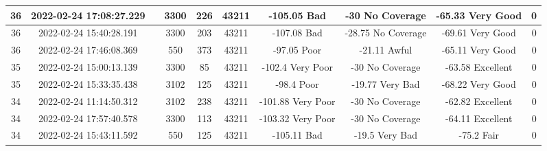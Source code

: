 \begin{longtable*}{|c|c|c|c|c|c|c|c|c|c|}
36&2022-02-24 17:08:27.229&&3300&226&43211& -105.05   Bad         & -30       No Coverage & -65.33    Very Good   & 0\\\hline
{}36&2022-02-24 15:40:28.191&&3300&203&43211& -107.08   Bad         & -28.75    No Coverage & -69.61    Very Good   & 0\\\hline
{}36&2022-02-24 17:46:08.369&&550&373&43211& -97.05    Poor        & -21.11    Awful       & -65.11    Very Good   & 0\\\hline
{}35&2022-02-24 15:00:13.139&&3300&85&43211& -102.4    Very Poor   & -30       No Coverage & -63.58    Excellent   & 0\\\hline
{}35&2022-02-24 15:33:35.438&&3102&125&43211& -98.4     Poor        & -19.77    Very Bad    & -68.22    Very Good   & 0\\\hline
{}34&2022-02-24 11:14:50.312&&3102&238&43211& -101.88   Very Poor   & -30       No Coverage & -62.82    Excellent   & 0\\\hline
{}34&2022-02-24 17:57:40.578&&3300&113&43211& -103.32   Very Poor   & -30       No Coverage & -64.11    Excellent   & 0\\\hline
{}34&2022-02-24 15:43:11.592&&550&125&43211& -105.11   Bad         & -19.5     Very Bad    & -75.2     Fair        & 0\\\hline

\end{longtable*}
